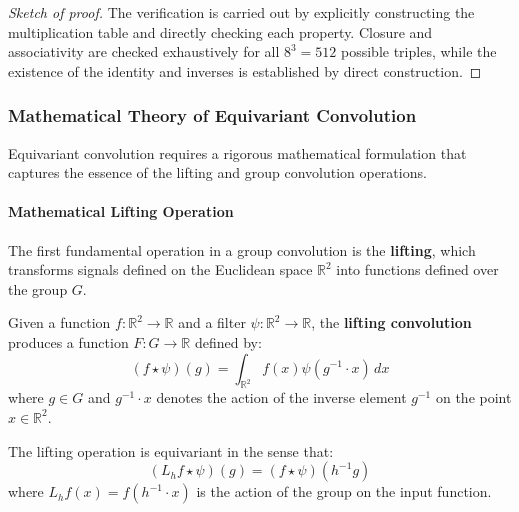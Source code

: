 \begin{proof}[Sketch of proof]
The verification is carried out by explicitly constructing the multiplication table and directly checking each property. Closure and associativity are checked exhaustively for all $8^3 = 512$ possible triples, while the existence of the identity and inverses is established by direct construction.
\end{proof}

\subsubsection{Mathematical Theory of Equivariant Convolution}\label{subsubsec:convolucion_equivariante_matematica}

Equivariant convolution requires a rigorous mathematical formulation that captures the essence of the lifting and group convolution operations.

\paragraph{Mathematical Lifting Operation}

The first fundamental operation in a group convolution is the \textbf{lifting}, which transforms signals defined on the Euclidean space $\mathbb{R}^2$ into functions defined over the group $G$.

\begin{definition}\label{def:convolucion_elevacion}
Given a function $f: \mathbb{R}^2 \to \mathbb{R}$ and a filter $\psi: \mathbb{R}^2 \to \mathbb{R}$, the \textbf{lifting convolution} produces a function $F: G \to \mathbb{R}$ defined by:
\begin{equation}
(f \star \psi)(g) = \int_{\mathbb{R}^2} f(x) \psi(g^{-1} \cdot x) \, dx
\end{equation}
where $g \in G$ and $g^{-1} \cdot x$ denotes the action of the inverse element $g^{-1}$ on the point $x \in \mathbb{R}^2$.
\end{definition}

\begin{theorem}\label{thm:equivarianza_elevacion}
The lifting operation is equivariant in the sense that:
\begin{equation}
(L_h f \star \psi)(g) = (f \star \psi)(h^{-1}g)
\end{equation}
where $L_h f(x) = f(h^{-1} \cdot x)$ is the action of the group on the input function.
\end{theorem}

